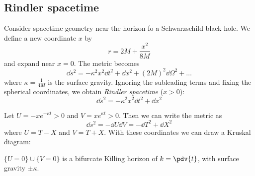 \documentclass{jknotes}
\begin{document}
\subsection{Rindler spacetime}
Consider spacetime geometry near the horizon fo a Schwarzschild black hole. We define a new coordinate \(x\) by
\begin{equation}
    r = 2M + \frac{x^2}{8M}
\end{equation}
and expand near \(x=0\). The metric becomes
\begin{equation}
    \dd{s}^2 = -\kappa^2x^2\dd{t}^2 + \dd{x}^2 + (2M)^2 \dd{\Omega}^2 + \dots
\end{equation}
where \(\kappa=\frac{1}{4M}\) is the surface gravity. Ignoring the subleading terms and fixing the spherical coordinates, we obtain \emph{Rindler spacetime} (\(x>0\)):
\begin{equation}
    \dd{s}^2 = -\kappa^2x^2\dd{t}^2 + \dd{x}^2
\end{equation}

Let \(U=-xe^{-\kappa t}>0\) and \(V=xe^{\kappa t}>0\). Then we can write the metric as
\begin{equation}
    \dd{s}^2 = -\dd{U}\dd{V} = -\dd{T}^2 + \dd{X}^2
\end{equation}
where \(U = T-X\) and \(V = T+X\). With these coordinates we can draw a Kruskal diagram:

\begin{figure}[H]
    \centering
\end{figure}
\(\{U=0\}\cup\{V=0\}\) is a bifurcate Killing horizon of \(k=\pdv{t}\), with surface gravity \(\pm\kappa\). 
\end{document}
